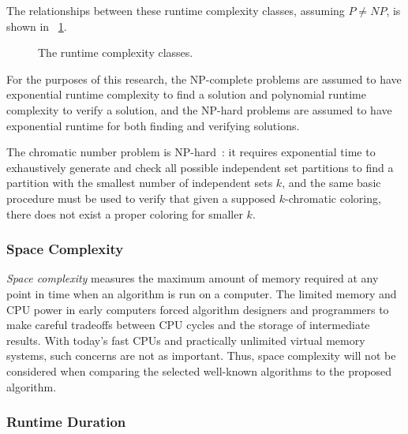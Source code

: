 The relationships between these runtime complexity classes, assuming \(P\ne NP\), is shown in
\figurename~\ref{fig:complexity}.

\begin{figure}[H]
  \centering
  \caption{The runtime complexity classes.}
  \label{fig:complexity}
\end{figure}

For the purposes of this research, the NP-complete problems are assumed to have exponential runtime complexity to
find a solution and polynomial runtime complexity to verify a solution, and the NP-hard problems are assumed to
have exponential runtime for both finding and verifying solutions.

The chromatic number problem is NP-hard~\cite{mcdiarmid}: it requires exponential time to exhaustively generate and
check all possible independent set partitions to find a partition with the smallest number of independent sets
\(k\), and the same basic procedure must be used to verify that given a supposed \(k\)-chromatic coloring, there
does not exist a proper coloring for smaller \(k\).

\subsubsection{Space Complexity}\label{sec:sub:sub:space}

\emph{Space complexity} measures the maximum amount of memory required at any point in time when an algorithm is
run on a computer.  The limited memory and CPU power in early computers forced algorithm designers and programmers
to make careful tradeoffs between CPU cycles and the storage of intermediate results.  With today's fast CPUs and
practically unlimited virtual memory systems, such concerns are not as important.  Thus, space complexity will not
be considered when comparing the selected well-known algorithms to the proposed algorithm.

\subsubsection{Runtime Duration}\label{sec:sub:sub:duration}

